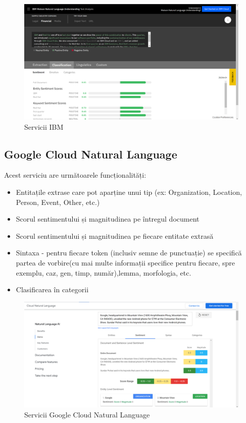 \begin{figure}[H]
	\centering
	\includegraphics[width=150mm]{figs/ibmCloud.png}
    \caption{Servicii IBM}
	\label{fig:ibmCloud}
\end{figure}
\subsection{Google Cloud Natural Language}
{\noindent Acest serviciu are următoarele funcționalități:}
\begin{itemize}
    \setlength\itemsep{0.5em}
    \item Entitațile extrase care pot aparține unui tip (ex: Organization, Location, Person, Event, Other, etc.)
    \item Scorul sentimentului și magnitudinea pe întregul document
    \item Scorul sentimentului și magnitudinea pe fiecare entitate extrasă 
    \item Sintaxa - pentru fiecare token (inclusiv semne de punctuație) se specifică partea de vorbire(cu mai multe informații specifice pentru fiecare, spre exemplu, caz, gen, timp, număr),lemma, morfologia, etc.
    \item Clasificarea în categorii
\end{itemize}
\begin{figure}[H]
	\centering
	\includegraphics[width=150mm]{figs/googleSearch.png}
    \caption{Servicii Google Cloud Natural Language}
	\label{fig:googleSearch}
\end{figure}
